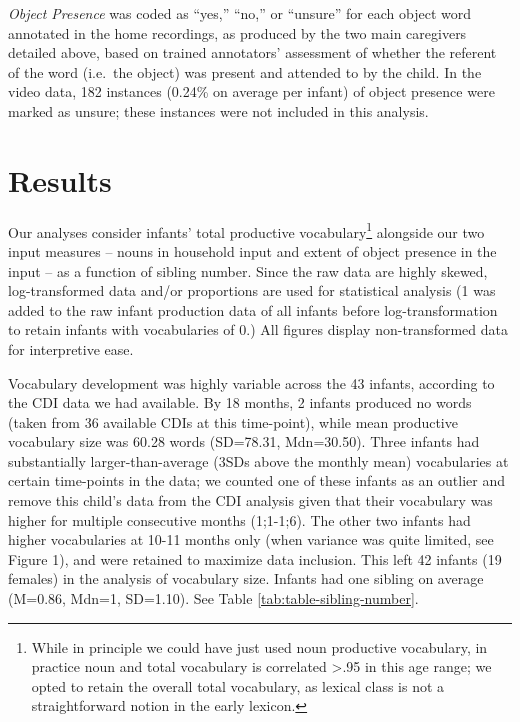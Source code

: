 \documentclass[
  english,
  man,floatsintext]{apa6}
\begin{document}
\emph{Object Presence} was coded as ``yes,'' ``no,'' or ``unsure'' for each object word annotated in the home recordings, as produced by the two main caregivers detailed above, based on trained annotators' assessment of whether the referent of the word (i.e.~the object) was present and attended to by the child. In the video data, 182 instances (0.24\% on average per infant) of object presence were marked as unsure; these instances were not included in this analysis.

\hypertarget{results}{%
\section{Results}\label{results}}

Our analyses consider infants' total productive vocabulary\footnote{While in principle we could have just used noun productive vocabulary, in practice noun and total vocabulary is correlated \textgreater.95 in this age range; we opted to retain the overall total vocabulary, as lexical class is not a straightforward notion in the early lexicon.} alongside our two input measures -- nouns in household input and extent of object presence in the input -- as a function of sibling number. Since the raw data are highly skewed, log-transformed data and/or proportions are used for statistical analysis (1 was added to the raw infant production data of all infants before log-transformation to retain infants with vocabularies of 0.) All figures display non-transformed data for interpretive ease.

Vocabulary development was highly variable across the 43 infants, according to the CDI data we had available. By 18 months, 2 infants produced no words (taken from 36 available CDIs at this time-point), while mean productive vocabulary size was 60.28 words (SD=78.31, Mdn=30.50). Three infants had substantially larger-than-average (3SDs above the monthly mean) vocabularies at certain time-points in the data; we counted one of these infants as an outlier and remove this child's data from the CDI analysis given that their vocabulary was higher for multiple consecutive months (1;1-1;6). The other two infants had higher vocabularies at 10-11 months only (when variance was quite limited, see Figure 1), and were retained to maximize data inclusion. This left 42 infants (19 females) in the analysis of vocabulary size. Infants had one sibling on average (M=0.86, Mdn=1, SD=1.10). See Table \ref{tab:table-sibling-number}.
\end{document}
